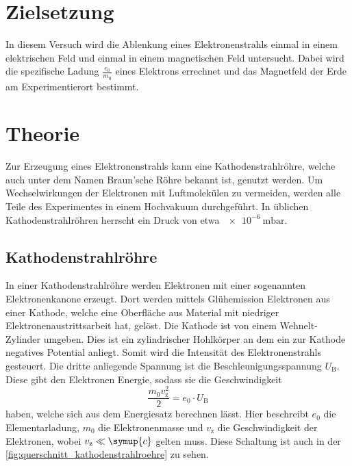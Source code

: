 \section{Zielsetzung}
\label{sec:Zielsetzung}

    In diesem Versuch wird die Ablenkung eines Elektronenstrahls einmal in einem elektrischen Feld und einmal in einem magnetischen Feld untersucht. Dabei wird 
    die spezifische Ladung $\frac{e_0}{m_0}$ eines Elektrons errechnet und das Magnetfeld der Erde am Experimentierort bestimmt. 

\section{Theorie}
\label{sec:Theorie}

Zur Erzeugung eines Elektronenstrahls kann eine Kathodenstrahlröhre, welche auch unter dem Namen Braun'sche Röhre bekannt ist, genutzt werden. Um Wechselwirkungen 
der Elektronen mit Luftmolekülen zu vermeiden, werden alle Teile des Experimentes in einem Hochvakuum durchgeführt. In üblichen Kathodenstrahlröhren herrscht ein Druck von 
etwa $\SI{e-6}{\milli\bar}$. 

\subsection{Kathodenstrahlröhre}

    In einer Kathodenstrahlröhre werden Elektronen mit einer sogenannten Elektronenkanone erzeugt. Dort werden mittels Glühemission Elektronen aus einer
    Kathode, welche eine Oberfläche aus Material mit niedriger Elektronenaustrittsarbeit hat, gelöst. Die Kathode ist von einem Wehnelt-Zylinder umgeben.
    Dies ist ein zylindrischer Hohlkörper an dem ein zur Kathode negatives Potential anliegt. Somit wird die Intensität des Elektronenstrahls gesteuert. 
    Die dritte anliegende Spannung ist die Beschleunigungsspannung $U_{\text{B}}$. Diese gibt den Elektronen Energie, sodass sie die Geschwindigkeit
    \begin{equation} \label{eqn:v_z}
        \frac{m_0 v_{\text{z}}^2}{2} = e_0 \cdot U_{\text{B}}
    \end{equation}
    haben, welche sich aus dem Energiesatz berechnen lässt. Hier beschreibt $e_0$ die Elementarladung, $m_0$ die Elektronenmasse und $v_{\text{z}}$ die 
    Geschwindigkeit der Elektronen, wobei $v_{\text{z}} \ll \symup{c} $ gelten muss. Diese Schaltung ist auch in der \autoref{fig:querschnitt_kathodenstrahlroehre}
    zu sehen.\\

